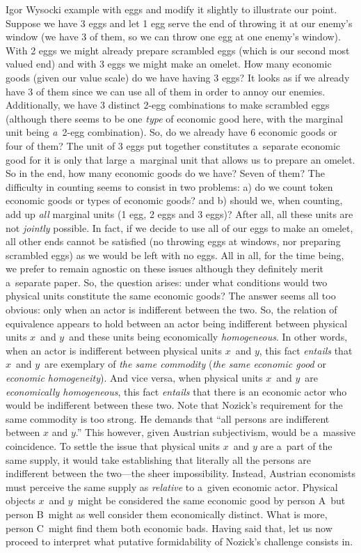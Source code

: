 \begin{artengenv}{Igor Wysocki}
{ example with eggs and modify it slightly to illustrate our point. Suppose we have 3 eggs and let 1 egg serve the end of throwing it at our enemy's window (we have 3 of them, so we can throw one egg at one enemy's window). With 2 eggs we might already prepare scrambled eggs (which is our second most valued end) and with 3 eggs we might make an omelet. How many economic goods (given our value scale) do we have having 3 eggs? It looks as if we already have 3 of them since we can use all of them in order to annoy our enemies. Additionally, we have 3 distinct 2-egg combinations to make scrambled eggs (although there seems to be one \textit{type} of economic good here, with the marginal unit being \textit{a}~2-egg combination). So, do we already have 6 economic goods or four of them? The unit of 3 eggs put together constitutes a~separate economic good for it is only that large a~marginal unit that allows us to prepare an omelet. So in the end, how many economic goods do we have? Seven of them? The difficulty in counting seems to consist in two problems: a) do we count token economic goods or types of economic goods? and b) should we, when counting, add up \textit{all} marginal units (1 egg, 2 eggs and 3 eggs)? After all, all these units are not \textit{jointly} possible. In fact, if we decide to use all of our eggs to make an omelet, all other ends cannot be satisfied (no throwing eggs at windows, nor preparing scrambled eggs) as we would be left with no eggs. All in all, for the time being, we prefer to remain agnostic on these issues although they definitely merit a~separate paper.} So, the question arises: under what conditions would two physical units constitute the same economic goods? The answer seems all too obvious: only when an actor is indifferent between the two. So, the relation of equivalence appears to hold between an actor being indifferent between physical units $x$~and $y$~and these units being economically \textit{homogeneous}. In other words, when an actor is indifferent between physical units $x$~and $y$, this fact \textit{entails} that $x$~and $y$~are exemplary of \textit{the same commodity} (\textit{the same economic good} or \textit{economic homogeneity}). And vice versa, when physical units $x$~and $y$~are \textit{economically homogeneous}, this fact \textit{entails} that there is an economic actor who would be indifferent between these two. Note that Nozick's requirement for the same commodity is too strong. He demands that ``all persons are indifferent between $x$ and $y$.'' This however, given Austrian subjectivism, would be a~massive coincidence. To settle the issue that physical units $x$~and $y$ are a~part of the same supply, it would take establishing that literally all the persons are indifferent between the two---the sheer impossibility. Instead, Austrian economists must perceive the same supply as \textit{relative} to a~given economic actor. Physical objects $x$~and $y$~might be considered the same economic good by person A~but person B~might as well consider them economically distinct. What is more, person C~might find them both economic bads. Having said that, let us now proceed to interpret what putative formidability of Nozick's challenge consists in.


\end{artengenv}
